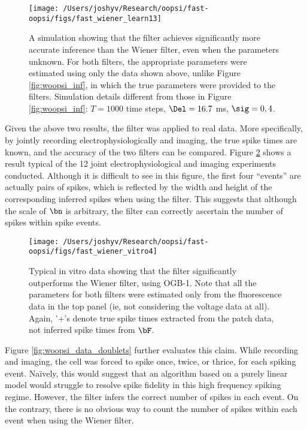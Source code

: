 \begin{figure}[h!]
\centering \texttt{[image: /Users/joshyv/Research/oopsi/fast-oopsi/figs/fast\_wiener\_learn13]}
\caption[parameters may be estimated using the \foopsi filter]{A simulation showing that the \foopsi filter achieves significantly more accurate inference than the Wiener filter, even when the parameters unknown.  For both filters, the appropriate parameters were estimated using only the data shown above, unlike Figure \ref{fig:woopsi_inf}, in which the true parameters were provided to the filters. Simulation details different from those in Figure \ref{fig:woopsi_inf}: $T=1000$ time steps, $\Del=16.7$ ms, $\sig=0,4$.} \label{fig:woopsi_learn}
\end{figure}

Given the above two results, the \foopsi filter was applied to real data.  More specifically, by jointly recording electrophysiologically and imaging, the true spike times are known, and the accuracy of the two filters can be compared.  Figure \ref{fig:woopsi_data} shows a result typical of the 12 joint electrophysiological and imaging experiments conducted. Although it is difficult to see in this figure, the first four ``events'' are actually pairs of spikes, which is reflected by the width and height of the corresponding inferred spikes when using the \foopsi filter. %
This suggests that although the scale of $\bn$ is arbitrary, the \foopsi filter can correctly ascertain the number of spikes within spike events.  

\begin{figure}[h!]
\centering \texttt{[image: /Users/joshyv/Research/oopsi/fast-oopsi/figs/fast\_wiener\_vitro4]}
\caption[\foopsi filter outperforms Wiener filter on biological data]{Typical in vitro data showing that the \foopsi filter significantly outperforms the Wiener filter, using OGB-1. Note that all the parameters for both filters were estimated only from the fluorescence data in the top panel (ie, not considering the voltage data at all).  Again, '$+$'s denote true spike times extracted from the patch data, not inferred spike times from $\bF$.} \label{fig:woopsi_data}
\end{figure}


Figure \ref{fig:woopsi_data_doublets} further evaluates this claim.  While recording and imaging, the cell was forced to spike once, twice, or thrice, for each spiking event.  Na\"{i}vely, this would suggest that an algorithm based on a purely linear model would struggle to resolve spike fidelity in this high frequency spiking regime.  However, the \foopsi filter infers the correct number of spikes in each event.  On the contrary, there is no obvious way to count the number of spikes within each event when using the Wiener filter.

